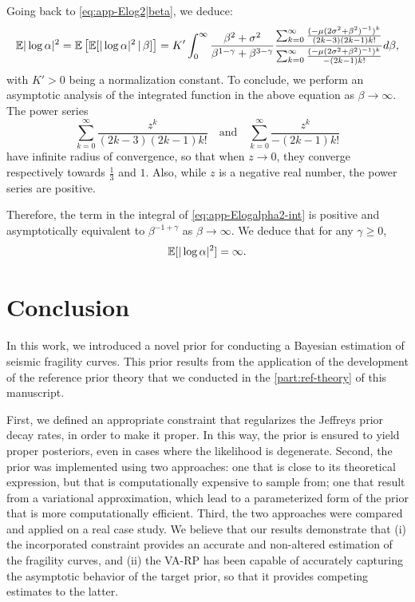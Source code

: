 Going back to \cref{eq:app-Elog2|beta}, we deduce:
    \begin{equation}\label{eq:app-Elogalpha2-int}
        \mathbb{E}|\log\alpha|^2 = \mathbb{E}\left[\mathbb{E}[|\log\alpha|^2\,|\,\beta]\right] = K'\int_0^\infty \frac{\beta^2+\sigma^2}{\beta^{1-\gamma}+\beta^{3-\gamma}}
        \frac{\sum_{k=0}^\infty \frac{(-\mu(2\sigma^2+\beta^2)^{-1})^k}{(2k-3)(2k-1)k!} }{\sum_{k=0}^\infty \frac{(-\mu(2\sigma^2+\beta^2)^{-1})^k}{-(2k-1)k!}}d\beta,
    \end{equation}
with $K'>0$ being a normalization constant.
To conclude, we perform an asymptotic analysis of the integrated function in the above equation as $\beta\to\infty$.
The power series 
    \begin{equation}
        \sum_{k=0}^\infty \frac{z^k}{(2k-3)(2k-1)k!} \quad\text{and}\quad 
        \sum_{k=0}^\infty \frac{z^k}{-(2k-1)k!}
    \end{equation}
have infinite radius of convergence, so that when $z\to0$, they converge respectively towards $\frac{1}{3}$ and $1$.
Also, while $z$ is a negative real number, the power series are positive.

Therefore, the term in the integral of \cref{eq:app-Elogalpha2-int} is positive and asymptotically equivalent to $\beta^{-1+\gamma}$ as $\beta\to\infty$. We deduce that for any $\gamma\geq0$,
    \begin{equation}
        \mathbb{E}[|\log\alpha|^2]=\infty.
    \end{equation}
    





\section{Conclusion}\label{sec:constr-frags:conclusion}




In this work, we introduced a novel prior for conducting a Bayesian estimation of seismic fragility curves.
This prior results from the application of the development of the reference prior theory that we conducted in the \cref{part:ref-theory} of this manuscript.

First, we defined an appropriate constraint that regularizes the Jeffreys prior decay rates, in order to make it proper. In this way, the prior is ensured to yield proper posteriors, even in cases where the likelihood is degenerate.
Second, the prior was implemented using two approaches: one that is close to its theoretical expression, but that is computationally expensive to sample from; one that result from a variational approximation, which lead to a parameterized form of the prior that is more computationally efficient.
Third, the two approaches were compared and applied on a real case study. 
We believe that our results demonstrate that (i) the incorporated constraint provides an accurate and non-altered estimation of the fragility curves, and (ii) the VA-RP has been capable of accurately capturing the asymptotic behavior of the target prior, so that it provides competing estimates to the latter.

